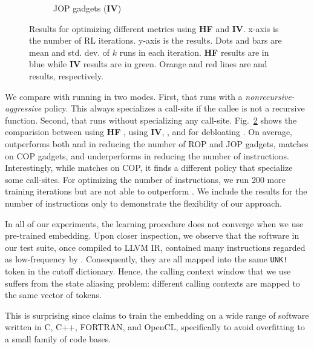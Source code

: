 \begin{figure}
\begin{subfigure}[b]{0.4\textwidth}
         \label{fig:inst2vec_inst}
         \vspace{-0.2in}
         \caption{JOP gadgets (\textbf{IV})}
       \end{subfigure}
       \caption{
Results for optimizing different metrics using \textbf{HF} and \textbf{IV}. x-axis is the number
of RL iterations. y-axis is the results. Dots and bars are mean and std. dev. of
$k$ runs in each iteration. \textbf{HF} results are in blue while
\textbf{IV} results are in green. Orange and red lines are \occamo and \occama results, respectively.}
     \label{fig:results}
     \end{figure}



We compare \doccam with \occam running in two modes.
%
First, \occama that runs \occam with a
\emph{nonrecursive-aggressive} policy. This always specializes a
call-site if the callee is not a recursive function.
%
Second, \occamo that runs \occam without specializing any call-site.
%
Fig.~\ref{fig:results} shows the comparision between \doccam using \textbf{HF}
, \doccam using \textbf{IV}, \occama , and \occamo for debloating \gnutree. 
On average, \doccam outperforms both \occamo and \occama in reducing the number of
ROP and JOP gadgets, matches \occamo on COP gadgets, and underperforms 
in reducing the number of instructions. Interestingly, while \doccam matches
\occamo on COP, it finds a different policy that specialize some call-sites.
For optimizing the number of instructions, we run 200 more training iterations
but are not able to outperform \occamo. We include the results for the number of
instructions only to demonstrate the flexibility of our approach.

In all of our experiments, the learning procedure does not converge when we use
\insttovec pre-trained embedding. Upon closer inspection, we observe that
the software in our test suite, once compiled to LLVM IR, contained many
instructions regarded as low-frequency by \insttovec. Consequently, they are all
mapped into the same \texttt{UNK!} token in the cutoff dictionary. Hence, the
calling context window that we use suffers from the state aliasing problem: different
calling contexts are mapped to the same vector of tokens. 

This is surprising since \insttovec claims to train the embedding on a wide
range of software written in C, C++, FORTRAN, and OpenCL, specifically to avoid overfitting
to a small family of code bases.

